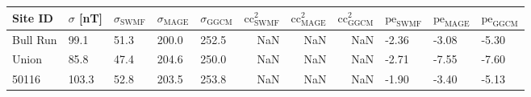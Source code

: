 \begin{tabular}{lllllrrrlll}
\toprule
Site ID & $\sigma$ [nT] & $\sigma_\text{SWMF}$ & $\sigma_\text{MAGE}$ & $\sigma_\text{GGCM}$ & $\text{cc}^2_\text{SWMF}$ & $\text{cc}^2_\text{MAGE}$ & $\text{cc}^2_\text{GGCM}$ & $\text{pe}_\text{SWMF}$ & $\text{pe}_\text{MAGE}$ & $\text{pe}_\text{GGCM}$ \\
\midrule
Bull Run & 99.1 & 51.3 & 200.0 & 252.5 & NaN & NaN & NaN & -2.36 & -3.08 & -5.30 \\
Union & 85.8 & 47.4 & 204.6 & 250.0 & NaN & NaN & NaN & -2.71 & -7.55 & -7.60 \\
50116 & 103.3 & 52.8 & 203.5 & 253.8 & NaN & NaN & NaN & -1.90 & -3.40 & -5.13 \\
\bottomrule
\end{tabular}
